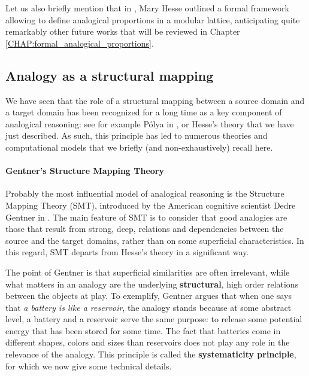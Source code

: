 Let us also briefly mention that in \cite{Hes59}, Mary Hesse outlined a formal
framework allowing to define analogical proportions in a modular lattice,
anticipating quite remarkably other future works that will be reviewed in
Chapter \ref{CHAP:formal_analogical_proportions}.

\subsection{Analogy as a structural mapping}

We have seen that the role of a structural mapping between a source domain and
a target domain has been recognized for a long time as a key component of
analogical reasoning: see for example P\'olya in \cite{Pol54}, or Hesse's
theory that we have just described. As such, this principle has led to numerous
theories and computational models that we briefly (and non-exhaustively) recall
here.

\paragraph{Gentner's Structure Mapping Theory\\}

Probably the most influential model of analogical reasoning is the Structure
Mapping Theory (SMT), introduced by the American cognitive scientist Dedre
Gentner in \cite{Gen83}. The main feature of SMT is to consider that good
analogies are those that result from strong, deep, relations and dependencies
between the source and the target domains, rather than on some superficial
characteristics. In this regard, SMT departs from Hesse's theory in a
significant way.

The point of Gentner is that superficial similarities are often irrelevant,
while what matters in an analogy are the underlying \textbf{structural}, high
order relations between the objects at play. To exemplify, Gentner argues that
when one says that \textit{a battery is like a reservoir}, the analogy stands
because at some abstract level, a battery and a reservoir serve the same
purpose: to release some potential energy that has been stored for some time.
The fact that batteries come in different shapes, colors and sizes than
reservoirs does not play any role in the relevance of the analogy. This
principle is called the \textbf{systematicity principle}, for which we now give
some technical details.

